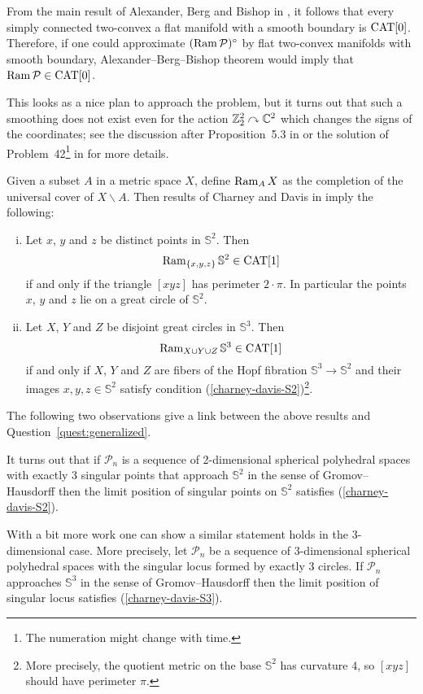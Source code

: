 \documentclass[oneside,a4paper]{article}
\def\Ram{\mathop{\rm Ram}\nolimits}
\def\SS{\mathbb{S}}
\begin{document}
From the main result of Alexander, Berg and Bishop  in \cite{ABB},
it follows that every simply connected two-convex a flat manifold with a smooth boundary is $\mathrm{CAT}[0]$. Therefore, if one could approximate  $(\Ram  \mathcal{P})^\circ$ by flat two-convex manifolds with smooth boundary, Alexander--Berg--Bishop theorem would imply that $\Ram  \mathcal{P}\z\in\CAT[0]$.

This looks as a nice plan to approach the problem, but it turns out that such a smoothing does not exist even for the action $\mathbb{Z}_2^2\curvearrowright\mathbb{C}^2$ which changes the signs of the coordinates;
see the discussion after Proposition~5.3 in \cite{panov-petrunin}
or the solution of Problem~42\footnote{The numeration might change with time.} in \cite{petrunin-orthodox} for more details.

Given a subset $A$ in a metric space $X$,
define $\Ram_A X$ as  the completion of the universal cover of $X\backslash A$.
Then results of  Charney and Davis in \cite{charney-davis-93} imply the following:
\begin{enumerate}[(i)]
\item\label{charney-davis-S2} Let $x$, $y$ and $z$ be distinct points in $\SS^2$.
Then
$$\Ram_{\{x,y,z\}}\SS^2\in \CAT[1]$$
if and only if the triangle $[xyz]$ has perimeter $2\cdot\pi$.
In particular the points $x$, $y$ and $z$ lie on a great circle of $\SS^2$.
\item\label{charney-davis-S3}
Let $X$, $Y$ and $Z$ be disjoint great circles in $\SS^3$.
Then
$$\Ram_{X\cup Y\cup Z}\SS^3\in\CAT[1]$$ if and only if $X$, $Y$ and $Z$ are fibers of the Hopf fibration $\SS^3\to \SS^2$ and their images $x,y,z\in \SS^2$ satisfy condition (\ref{charney-davis-S2})\footnote{More precisely, the  quotient metric on the base $\SS^2$ has curvature $4$, so $[xyz]$ should have perimeter $\pi$.}.
\end{enumerate}

The following two observations give a link between the above results and Question~\ref{quest:generalized}.

It turns out that if $\mathcal{P}_n$ is a sequence of 2-dimensional spherical polyhedral spaces with exactly 3 singular points that approach $\SS^2$ in the sense of Gromov--Hausdorff then
the limit position of singular points on $\SS^2$ satisfies (\ref{charney-davis-S2}).

With a bit more work one can show a similar statement holds in the 3-dimensional case.
More precisely, let $\mathcal{P}_n$ be a sequence of 3-dimensional spherical polyhedral spaces with the singular locus formed by exactly 3 circles.
If $\mathcal{P}_n$ approaches $\SS^3$ in the sense of Gromov--Hausdorff then the limit position of singular locus  satisfies (\ref{charney-davis-S3}).
\end{document}
